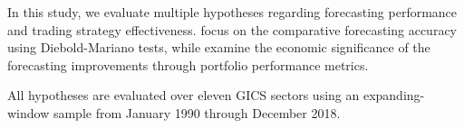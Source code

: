 In this study, we evaluate multiple hypotheses regarding forecasting performance and trading strategy effectiveness.  focus on the comparative forecasting accuracy using Diebold-Mariano tests, while  examine the economic significance of the forecasting improvements through portfolio performance metrics.

All hypotheses are evaluated over eleven GICS sectors using an expanding-window sample from January 1990 through December 2018.

